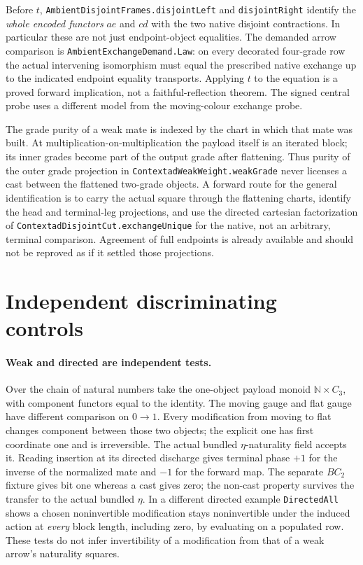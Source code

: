 \documentclass[11pt]{article}
\newcommand{\code}{\nolinkurl}
\begin{document}
Before $t$, \code{AmbientDisjointFrames.disjointLeft} and \code{disjointRight} identify the \emph{whole encoded functors} $ae$ and $cd$ with the two native disjoint contractions. In particular these are not just endpoint-object equalities. The demanded arrow comparison is \code{AmbientExchangeDemand.Law}: on every decorated four-grade row the actual intervening isomorphism must equal the prescribed native exchange up to the indicated endpoint equality transports. Applying $t$ to the equation is a proved forward implication, not a faithful-reflection theorem. The signed central probe uses a different model from the moving-colour exchange probe.

The grade purity of a weak mate is indexed by the chart in which that mate was built. At multiplication-on-multiplication the payload itself is an iterated block; its inner grades become part of the output grade after flattening. Thus purity of the outer grade projection in \code{ContextadWeakWeight.weakGrade} never licenses a cast between the flattened two-grade objects. A forward route for the general identification is to carry the actual square through the flattening charts, identify the head and terminal-leg projections, and use the directed cartesian factorization of \code{ContextadDisjointCut.exchangeUnique} for the native, not an arbitrary, terminal comparison. Agreement of full endpoints is already available and should not be reproved as if it settled those projections.
\section{Independent discriminating controls}
\paragraph{Weak and directed are independent tests.} Over the chain of natural numbers take the one-object payload monoid $\mathbb N\times C_3$, with component functors equal to the identity. The moving gauge and flat gauge have different comparison on $0\to1$. Every modification from moving to flat changes component between those two objects; the explicit one has first coordinate one and is irreversible. The actual bundled $\eta$-naturality field accepts it. Reading insertion at its directed discharge gives terminal phase $+1$ for the inverse of the normalized mate and $-1$ for the forward map. The separate $BC_2$ fixture gives bit one whereas a cast gives zero; the non-cast property survives the transfer to the actual bundled $\eta$. In a different directed example \code{DirectedAll} shows a chosen noninvertible modification stays noninvertible under the induced action at \emph{every} block length, including zero, by evaluating on a populated row. These tests do not infer invertibility of a modification from that of a weak arrow's naturality squares.
\end{document}
